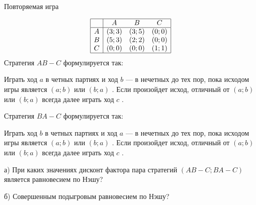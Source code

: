 \begin{problem}
 Повторяемая игра

\[\begin{array}{|c|ccc|}  \hline {} & {A} & {B} & {C} \\  \hline {A} & {\left(3;3\right)} & {\left(3;5\right)} & {\left(0;0\right)} \\ {B} & {\left(5;3\right)} & {\left(2;2\right)} & {\left(0;0\right)} \\ {C} & {\left(0;0\right)} & {\left(0;0\right)} & {\left(1;1\right)} \\  \hline  \end{array}\]
Стратегия  $AB-C$  формулируется так:\par
Играть ход  $a$  в четных партиях и ход  $b$  — в нечетных до тех пор, пока исходом игры является  $\left(a;b\right)$  или  $\left(b;a\right)$ . Если произойдет исход, отличный от  $\left(a;b\right)$  или  $\left(b;a\right)$  всегда далее играть ход  $c$ .\par
Стратегия  $BA-C$  формулируется так:\par
Играть ход  $b$  в четных партиях и ход  $a$  — в нечетных до тех пор, пока исходом игры является  $\left(a;b\right)$  или  $\left(b;a\right)$ . Если произойдет исход, отличный от  $\left(a;b\right)$  или  $\left(b;a\right)$  всегда далее играть ход  $c$ .\par
а) При каких значениях дисконт фактора пара стратегий  $\left(AB-C;BA-C\right)$  является равновесием по Нэшу?\par
б) Совершенным подыгровым равновесием по Нэшу?



\begin{sol}

\end{sol}
\end{problem}



